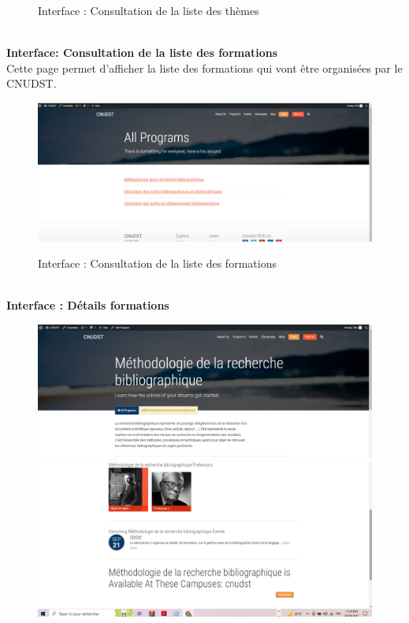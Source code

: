 \begin{itemize}
\begin{figure}[!h]
		\caption{Interface : Consultation de la liste des thèmes }
		\label{Org}
	\end{figure}\\
	\textbf{Interface: Consultation de la liste des formations}\\
	Cette page permet d'afficher la liste des formations qui vont être organisées par le CNUDST.
	\begin{figure}[!h]
		\centering
		{\includegraphics[width=1.05\textwidth]{D) IMAGES/allprog.png}}
		\caption{Interface : Consultation de la liste des formations }
		\label{Org}
	\end{figure}\\
\newpage
	\textbf{Interface : Détails formations}\\
	\begin{figure}[!h]
		\centering
		{\includegraphics[width=1.05\textwidth]{D) IMAGES/detfor.png}}
		{\includegraphics[width=1.05\textwidth]{D) IMAGES/detfor2.png}}

\end{figure}
\end{itemize}
